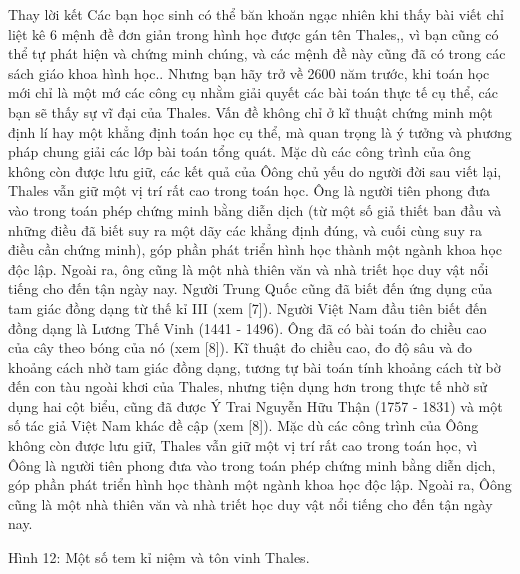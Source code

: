 \begin{multicols}{2}
{	Thay lời kết 
	Các bạn học sinh có thể băn khoăn ngạc nhiên khi thấy bài viết chỉ liệt kê 6 mệnh đề đơn giản trong hình học được gán tên Thales,, vì bạn cũng có thể tự phát hiện và chứng minh chúng, và các mệnh đề này cũng đã có trong các sách giáo khoa hình học.. Nhưng bạn hãy trở về 2600 năm trước, khi toán học mới chỉ là một mớ các công cụ nhằm giải quyết các bài toán thực tế cụ thể, các bạn sẽ thấy sự vĩ đại của Thales. Vấn đề không chỉ ở kĩ thuật chứng minh một định lí hay một khẳng định toán học cụ thể, mà quan trọng là ý tưởng và phương pháp chung giải các lớp bài toán tổng quát. 
	Mặc dù các công trình của ông không còn được lưu giữ, các kết quả của Ôông chủ yếu do người đời sau viết lại, Thales vẫn giữ một vị trí rất cao trong toán học. Ông là người tiên phong đưa vào trong toán phép chứng minh bằng diễn dịch (từ một số giả thiết ban đầu và những điều đã biết suy ra một dãy các khẳng định đúng, và cuối cùng suy ra điều cần chứng minh), góp phần phát triển hình học thành một ngành khoa học độc lập. Ngoài ra, ông cũng là một nhà thiên văn và nhà triết học duy vật nổi tiếng cho đến tận ngày nay.
	Người Trung Quốc cũng đã biết đến ứng dụng của tam giác đồng dạng từ thế kỉ III (xem [7]). Người Việt Nam đầu tiên biết đến đồng dạng là Lương Thế Vinh (1441 - 1496). Ông đã có bài toán đo chiều cao của cây theo bóng của nó (xem  [8]). Kĩ thuật đo chiều cao, đo độ sâu và đo khoảng cách nhờ tam giác đồng dạng, tương tự bài toán tính khoảng cách từ bờ đến con tàu ngoài khơi của Thales, nhưng tiện dụng hơn trong thực tế nhờ sử dụng hai cột biểu, cũng đã được Ý Trai Nguyễn Hữu Thận (1757 - 1831) và một số tác giả Việt Nam khác đề cập (xem  [8]). 
	Mặc dù các công trình của Ôông không còn được lưu giữ, Thales vẫn giữ một vị trí rất cao trong toán học, vì Ôông là người tiên phong đưa vào trong toán phép chứng minh bằng diễn dịch, góp phần phát triển hình học thành một ngành khoa học độc lập. Ngoài ra, Ôông cũng là một nhà thiên văn và nhà triết học duy vật nổi tiếng cho đến tận ngày nay.
	
	Hình 12: Một số tem kỉ niệm và tôn vinh Thales.
	
}
\end{multicols}
